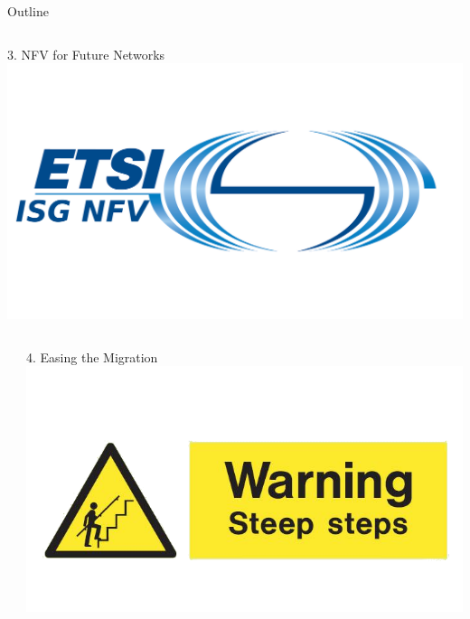 \documentclass[a4paper]{beamer}
\begin{document}
\begin{frame}{Outline}
\begin{columns}[c]
		\begin{block}{3. NFV for Future Networks}
			\includegraphics[width= \textwidth]{etsinfv.png}
		\end{block}
																																          
																																      
	\end{columns}
															
															
																    
	\begin{columns}[c] %
		\begin{block}{}
		\end{block}
																														
		\begin{block}{4. Easing the Migration}
			\includegraphics[width= \textwidth]{loco.png}
		\end{block}
																																 

\end{columns}
\end{frame}
\end{document}
